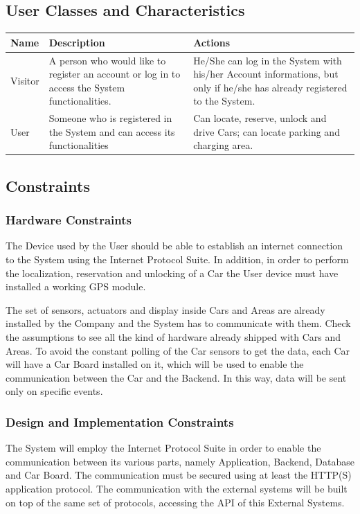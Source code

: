 \subsection{User Classes and Characteristics}
\begin{center}
  \begin{tabular}{|p{}|p{}|p{}|}
    \hline
    \textbf{Name} & \textbf{Description} & \textbf{Actions} \\ \hline
    Visitor & A person who would like to register an account or log in to access the System functionalities. & He/She can log in the System with his/her Account informations, but only if he/she has already registered to the System.\\ \hline
    User & Someone who is registered in the System and can access its functionalities & Can locate, reserve, unlock and drive Cars; can locate parking and charging area.\\ \hline
    \end{tabular}
\end{center}
\vspace{5mm}

\subsection{Constraints}
\subsubsection{Hardware Constraints}\label{OE}
The Device used by the User should be able to establish an internet connection to the System using the Internet Protocol Suite. In addition, in order to perform the localization, reservation and unlocking of a Car the User device must have installed a working GPS module. 

The set of sensors, actuators and display inside Cars and Areas are already installed by the Company and the System has to communicate with them. Check the assumptions to see all the kind of hardware already shipped with Cars and Areas. 
To avoid the constant polling of the Car sensors to get the data, each Car will have a Car Board installed on it, which will be used to enable the communication between the Car and the Backend. In this way, data will be sent only on specific events.

\subsubsection{Design and Implementation Constraints}
The System will employ the Internet Protocol Suite in order to enable the communication between its various parts, namely Application, Backend, Database and Car Board. The communication must be secured using at least the HTTP(S) application protocol.
The communication with the external systems will be built on top of the same set of protocols, accessing the API of this External Systems.

